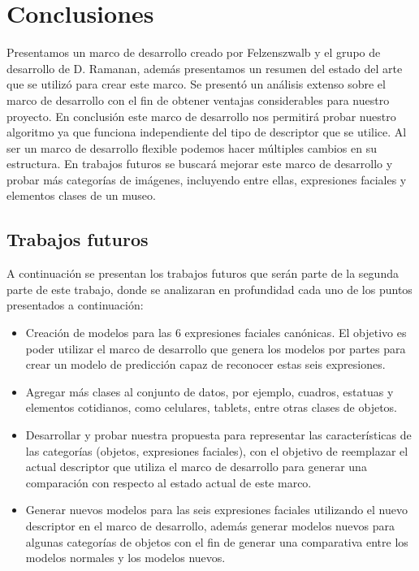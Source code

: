 \chapter[Conclusiones]{Conclusiones}\label{ch:capitulo6}
Presentamos un marco de desarrollo creado por Felzenszwalb y el grupo de desarrollo de D. Ramanan, además presentamos un resumen del estado del arte que se utilizó para crear este marco. Se presentó un análisis extenso sobre el marco de desarrollo con el fin de obtener ventajas considerables para nuestro proyecto. En conclusión este marco de desarrollo nos permitirá probar nuestro algoritmo ya que funciona independiente del tipo de descriptor que se utilice. Al ser un marco de desarrollo flexible podemos hacer múltiples cambios en su estructura. En trabajos futuros se buscará mejorar este marco de desarrollo y probar más categorías de imágenes, incluyendo entre ellas, expresiones faciales y elementos clases de un museo.

\section{Trabajos futuros}
A continuación se presentan los trabajos futuros que serán parte de la segunda parte de este trabajo, donde se analizaran en profundidad cada uno de los puntos presentados a continuación:
\begin{itemize}

\item Creación de modelos para las 6 expresiones faciales canónicas. El objetivo es poder utilizar el marco de desarrollo que genera los modelos por partes para crear un modelo de predicción capaz de reconocer estas seis expresiones.

\item Agregar más clases al conjunto de datos, por ejemplo, cuadros, estatuas y elementos cotidianos, como celulares, tablets, entre otras clases de objetos.

\item Desarrollar y probar nuestra propuesta para representar las características de las categorías (objetos, expresiones faciales), con el objetivo de reemplazar el actual descriptor que utiliza el marco de desarrollo para generar una comparación con respecto al estado actual de este marco.

\item Generar nuevos modelos para las seis expresiones faciales utilizando el nuevo descriptor en el marco de desarrollo, además generar modelos nuevos para algunas categorías de objetos con el fin de generar una comparativa entre los modelos normales y los modelos nuevos.

\end{itemize}
